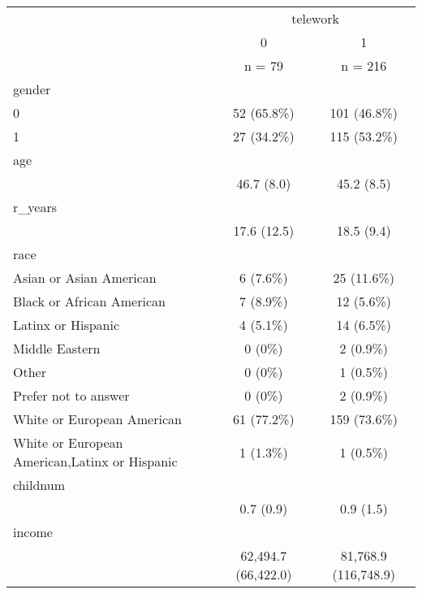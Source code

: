 \documentclass[
]{article}
\begin{document}
\begin{table}[ ht ] 
\centering 
\caption{}\label{}
\begin{tabular}{ l c c }
\toprule
 &   \multicolumn{ 2 }{c}{ telework }\\ 
  & 0 & 1 \\ 
 & n = 79 & n = 216 \\ 
 \midrule
gender &   &  \\ 
\hspace{6pt}    0 & 52 (65.8\%) & 101 (46.8\%)\\ 
\hspace{6pt}    1 & 27 (34.2\%) & 115 (53.2\%)\\ 
age &   &  \\ 
\hspace{6pt}   & 46.7 (8.0) & 45.2 (8.5)\\ 
r\_years &   &  \\ 
\hspace{6pt}   & 17.6 (12.5) & 18.5 (9.4)\\ 
race &   &  \\ 
\hspace{6pt}    Asian or Asian American & 6 (7.6\%) & 25 (11.6\%)\\ 
\hspace{6pt}    Black or African American & 7 (8.9\%) & 12 (5.6\%)\\ 
\hspace{6pt}    Latinx or Hispanic & 4 (5.1\%) & 14 (6.5\%)\\ 
\hspace{6pt}    Middle Eastern & 0 (0\%) & 2 (0.9\%)\\ 
\hspace{6pt}    Other & 0 (0\%) & 1 (0.5\%)\\ 
\hspace{6pt}    Prefer not to answer & 0 (0\%) & 2 (0.9\%)\\ 
\hspace{6pt}    White or European American & 61 (77.2\%) & 159 (73.6\%)\\ 
\hspace{6pt}    White or European American,Latinx or Hispanic & 1 (1.3\%) & 1 (0.5\%)\\ 
childnum &   &  \\ 
\hspace{6pt}   & 0.7 (0.9) & 0.9 (1.5)\\ 
income &   &  \\ 
\hspace{6pt}   & 62,494.7 (66,422.0) & 81,768.9 (116,748.9)\\ 
\bottomrule

\end{tabular}
\end{table}
\end{document}
